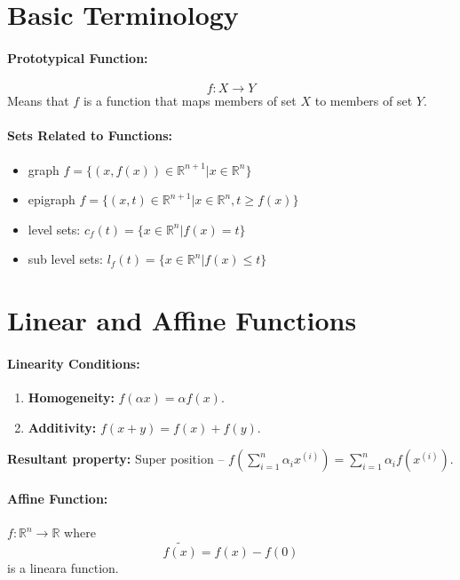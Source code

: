 \documentclass[a4paper,12pt]{report}
\def\reals{\mathbb{R}}
\begin{document}
\section{Basic Terminology}

\paragraph{Prototypical Function: } \begin{equation}
f:X\to Y
\end{equation}
Means that $f$ is a function that maps members of set $X$ to members of set $Y$.

\paragraph{Sets Related to Functions: } 
\begin{itemize}
\item graph $f = \{(x, f(x)) \in \reals^{n+1} | x \in \reals^n\}$
\item epigraph $f = \{(x, t) \in \reals^{n+1} | x \in \reals^n, t \geq f(x)\}$
\item level sets: $c_f(t) = \{x\in \reals^n | f(x) = t\}$
\item sub level sets: $l_f(t) = \{x\in\reals^n | f(x) \leq t\}$
\end{itemize}

\section{Linear and Affine Functions}

\paragraph{Linearity Conditions: } 
\begin{enumerate}
\item \textbf{Homogeneity: } $f(\alpha x) = \alpha f(x)$.
\item \textbf{Additivity: } $f(x+y) = f(x) + f(y)$.
\end{enumerate}

\textbf{Resultant property: } Super position -- $f(\sum_{i=1}^{n} \alpha_i x^{(i)} ) = \sum_{i=1}^{n} \alpha_i f(x^{(i)})$.

\paragraph{Affine Function: } $f: \reals^n \to \reals$ where \begin{equation}
\tilde{f(x)} = f(x) - f(0)
\end{equation}
is a lineara function.
\end{document}
